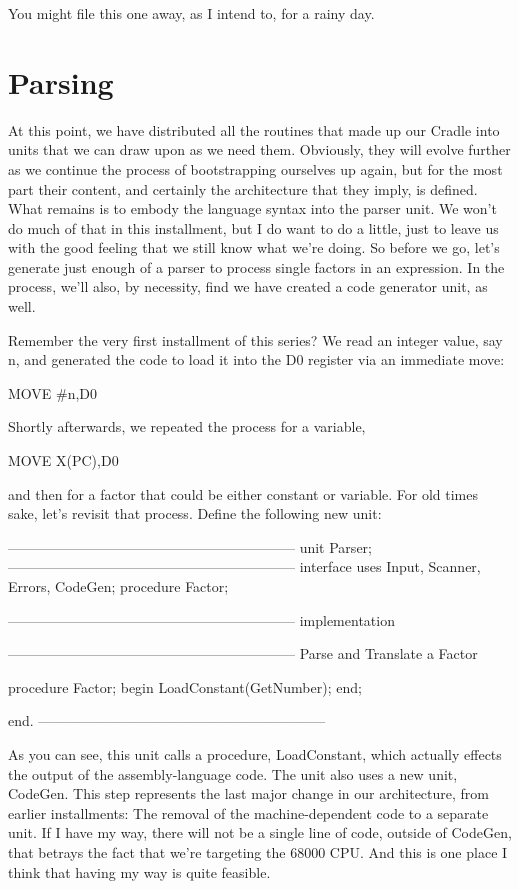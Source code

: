 \documentclass[float=false, crop=false]{standalone}
\begin{document}
You might file this one away, as I intend to, for a rainy day.


\section{Parsing}

At this point, we have distributed all the routines that made up our Cradle into
units that we can draw upon as we need them. Obviously, they will evolve further
as we continue the process of bootstrapping ourselves up again, but for the most
part their content, and certainly the architecture that they imply, is defined.
What remains is to embody the language syntax into the parser unit. We won't do
much of that in this installment, but I do want to do a little, just to leave us
with the good feeling that we still know what we're doing. So before we go,
let's generate just enough of a parser to process single factors in an
expression. In the process, we'll also, by necessity, find we have created a
code generator unit, as well.

Remember the very first installment of this series? We read an integer value,
say n, and generated the code to load it into the D0 register via an immediate
move:

	MOVE #n,D0

Shortly afterwards, we repeated the process for a variable,

	MOVE X(PC),D0

and then for a factor that could be either constant or variable. For old times
sake, let's revisit that process. Define the following new unit:

\begin{code}
{--------------------------------------------------------------}
unit Parser;
{--------------------------------------------------------------}
interface
uses Input, Scanner, Errors, CodeGen;
procedure Factor;

{--------------------------------------------------------------}
implementation

{--------------------------------------------------------------}
{ Parse and Translate a Factor }

procedure Factor;
begin
	LoadConstant(GetNumber);
end;

end.
{--------------------------------------------------------------}
\end{code}

As you can see, this unit calls a procedure, LoadConstant, which actually
effects the output of the assembly-language code. The unit also uses a new unit,
CodeGen. This step represents the last major change in our architecture, from
earlier installments: The removal of the machine-dependent code to a separate
unit. If I have my way, there will not be a single line of code, outside of
CodeGen, that betrays the fact that we're targeting the 68000 CPU. And this is
one place I think that having my way is quite feasible.
\end{document}
